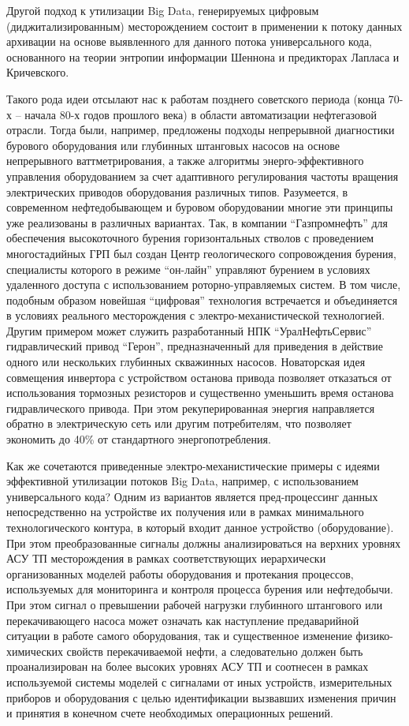Другой подход к утилизации Big Data, генерируемых цифровым (диджитализированным) месторождением состоит в применении к потоку данных архивации на основе выявленного для данного потока универсального кода, основанного на теории энтропии информации Шеннона и предикторах Лапласа и Кричевского.

Такого рода идеи отсылают нас к работам позднего советского периода (конца 70-х -- начала 80-х годов прошлого века) в области автоматизации нефтегазовой отрасли.
Тогда были, например, предложены подходы непрерывной диагностики бурового оборудования или глубинных штанговых насосов на основе непрерывного ваттметрирования, а также алгоритмы энерго-эффективного управления оборудованием за счет адаптивного регулирования частоты вращения электрических приводов оборудования различных типов.
Разумеется, в современном нефтедобывающем и буровом оборудовании многие эти принципы уже реализованы в различных вариантах.
Так, в компании ``Газпромнефть'' для обеспечения высокоточного бурения горизонтальных стволов с проведением многостадийных ГРП был создан Центр геологического сопровождения бурения, специалисты которого в режиме ``он-лайн'' управляют бурением в условиях удаленного доступа с использованием роторно-управляемых систем.
В том числе, подобным образом новейшая ``цифровая'' технология встречается и объединяется в условиях реального месторождения с электро-механистической технологией.
Другим примером может служить разработанный НПК ``УралНефтьСервис'' гидравлический привод ``Герон'', предназначенный для приведения в действие одного или нескольких глубинных скважинных насосов.
Новаторская идея совмещения инвертора с устройством останова привода позволяет отказаться от использования тормозных резисторов и существенно уменьшить время останова гидравлического привода.
При этом рекуперированная энергия направляется обратно в электрическую сеть или другим потребителям, что позволяет экономить до 40\% от стандартного энергопотребления.

Как же сочетаются приведенные электро-механистические примеры с идеями эффективной утилизации потоков Big Data, например, с использованием универсального кода? Одним из вариантов является пред-процессинг данных непосредственно на устройстве их получения или в рамках минимального технологического контура, в который входит данное устройство (оборудование).
При этом преобразованные сигналы должны анализироваться на верхних уровнях АСУ ТП месторождения в рамках соответствующих иерархически организованных моделей работы оборудования и протекания процессов, используемых для мониторинга и контроля процесса бурения или нефтедобычи.
При этом сигнал о превышении рабочей нагрузки глубинного штангового или перекачивающего насоса может означать как наступление предаварийной ситуации в работе самого оборудования, так и существенное изменение физико-химических свойств перекачиваемой нефти, а следовательно должен быть проанализирован на более высоких уровнях АСУ ТП и соотнесен в рамках используемой системы моделей с сигналами от иных устройств, измерительных приборов и оборудования с целью идентификации вызвавших изменения причин и принятия в конечном счете необходимых операционных решений.
 
